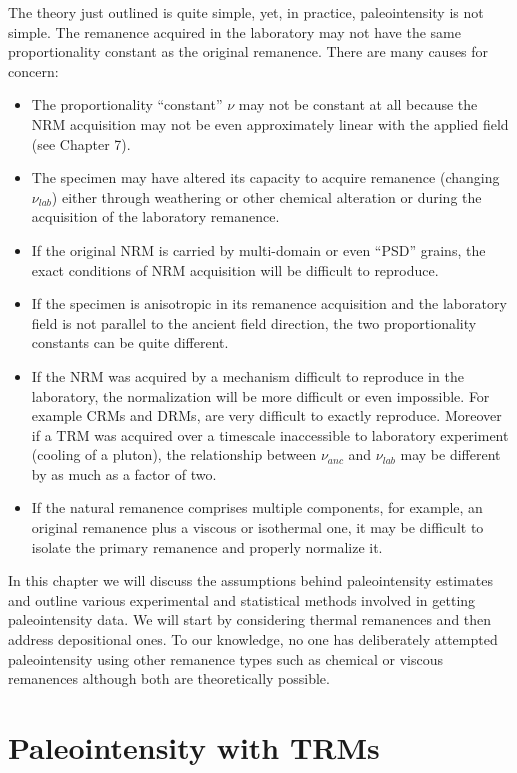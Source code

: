 The theory just outlined is quite simple, yet, in practice, paleointensity is not simple. The remanence acquired in the laboratory may not have the same proportionality constant as the original remanence.    There are many causes for concern:

\begin{itemize}
\item  The proportionality ``constant'' $\nu$ may not be constant at all because the NRM acquisition may not be even approximately linear with the applied field (see Chapter 7).   
\item  The specimen may have altered its capacity to acquire remanence (changing $\nu_{lab}$) either through weathering or other chemical alteration or during the acquisition of the laboratory remanence.
\item If the original NRM is carried by multi-domain or even ``PSD'' grains,  the exact conditions of NRM acquisition will be difficult to reproduce.  
\item  If the specimen is anisotropic in its remanence acquisition and the laboratory field is not parallel to the ancient field direction, the two proportionality constants can be quite different.   
\item If the NRM  was acquired by a mechanism difficult to reproduce in the laboratory, the normalization will be more difficult or even impossible.   For example  CRMs and  DRMs,   are very difficult to exactly reproduce.  Moreover if a TRM was acquired over a  timescale inaccessible to laboratory experiment (cooling of a pluton), the relationship between $\nu_{anc}$ and $\nu_{lab}$ may be different by as much as a factor of two.  
\item  If the natural remanence comprises  multiple  components, for example, an original remanence plus a viscous or isothermal one, it may be difficult to isolate the primary remanence and properly normalize it.    
\end{itemize}


    In this chapter we will discuss the assumptions behind paleointensity estimates and outline various experimental and statistical  methods involved in  getting paleointensity  data.    We will start by considering thermal remanences and  then address depositional ones.    To our knowledge, no one has deliberately attempted paleointensity using other remanence types such as chemical or viscous remanences although both are theoretically possible.

\section{Paleointensity with TRMs}

